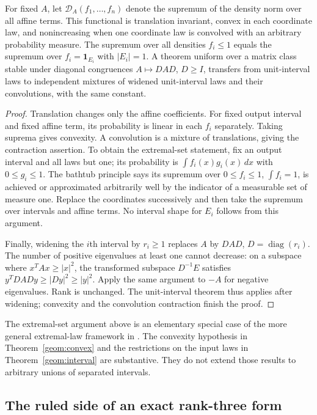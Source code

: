 \begin{proposition}\label{geom:laws}
For fixed $A$, let $\mathcal D_A(f_1,\ldots,f_n)$ denote the supremum of the density norm over all affine terms. This functional is translation invariant, convex in each coordinate law, and nonincreasing when one coordinate law is convolved with an arbitrary probability measure. The supremum over all densities $f_i\le1$ equals the supremum over $f_i=\mathbf1_{E_i}$ with $|E_i|=1$. A theorem uniform over a matrix class stable under diagonal congruences $A\mapsto DAD$, $D\ge I$, transfers from unit-interval laws to independent mixtures of widened unit-interval laws and their convolutions, with the same constant.
\end{proposition}
\begin{proof}
Translation changes only the affine coefficients. For fixed output interval and fixed affine term, its probability is linear in each $f_i$ separately. Taking suprema gives convexity. A convolution is a mixture of translations, giving the contraction assertion. To obtain the extremal-set statement, fix an output interval and all laws but one; its probability is $\int f_i(x)g_i(x)\,dx$ with $0\le g_i\le1$. The bathtub principle says its supremum over $0\le f_i\le1$, $\int f_i=1$, is achieved or approximated arbitrarily well by the indicator of a measurable set of measure one. Replace the coordinates successively and then take the supremum over intervals and affine terms. No interval shape for $E_i$ follows from this argument.

Finally, widening the $i$th interval by $r_i\ge1$ replaces $A$ by $DAD$, $D=\operatorname{diag}(r_i)$. The number of positive eigenvalues at least one cannot decrease: on a subspace where $x^TAx\ge|x|^2$, the transformed subspace $D^{-1}E$ satisfies $y^TDADy\ge|Dy|^2\ge|y|^2$. Apply the same argument to $-A$ for negative eigenvalues. Rank is unchanged. The unit-interval theorem thus applies after widening; convexity and the convolution contraction finish the proof.
\end{proof}

The extremal-set argument above is an elementary special case of the more general extremal-law framework in \citet{MMX2017}. The convexity hypothesis in Theorem~\ref{geom:convex} and the restrictions on the input laws in Theorem~\ref{geom:interval} are substantive. They do not extend those results to arbitrary unions of separated intervals.

\subsection{The ruled side of an exact rank-three form}

